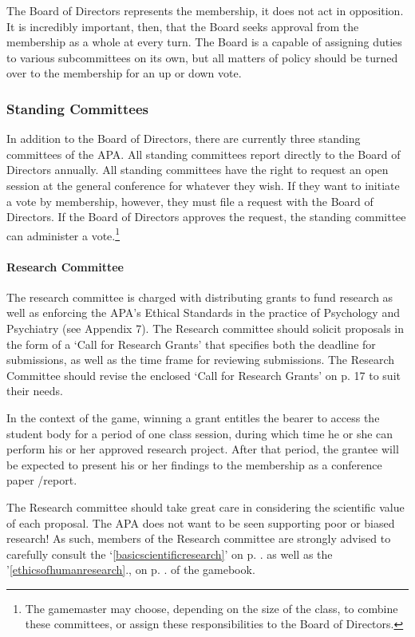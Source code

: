 The Board of Directors represents the membership, it does not act in opposition. It is incredibly important, then, that the Board seeks approval from the membership as a whole at every turn. The Board is a capable of assigning duties to various subcommittees on its own, but all matters of policy should be turned over to the membership for an up or down vote.

\subsubsection{Standing Committees}
\label{standingcommittees}

In addition to the Board of Directors, there are currently three standing committees of the APA. All standing committees report directly to the Board of Directors annually. All standing committees have the right to request an open session at the general conference for whatever they wish. If they want to initiate a vote by membership, however, they must file a request with the Board of Directors. If the Board of Directors approves the request, the standing committee can administer a vote.\footnote{The gamemaster may choose, depending on the size of the class, to combine these committees, or assign these responsibilities to the Board of Directors.}

\paragraph{Research Committee}
\label{researchcommittee}

The research committee is charged with distributing grants to fund research as well as enforcing the APA's Ethical Standards in the practice of Psychology and Psychiatry (see Appendix 7). The Research committee should solicit proposals in the form of a `Call for Research Grants' that specifies both the deadline for submissions, as well as the time frame for reviewing submissions. The Research Committee should revise the enclosed `Call for Research Grants' on p. 17 to suit their needs.

In the context of the game, winning a grant entitles the bearer to access the student body for a period of one class session, during which time he or she can perform his or her approved research project. After that period, the grantee will be expected to present his or her findings to the membership as a conference paper \slash  report.

The Research committee should take great care in considering the scientific value of each proposal. The APA does not want to be seen supporting poor or biased research! As such, members of the Research committee are strongly advised to carefully consult the ‘\ref{basicscientificresearch}’ on p. \pageref{basicscientificresearch}. as well as the '\ref{ethicsofhumanresearch}., on p. \pageref{ethicsofhumanresearch}. of the gamebook.

